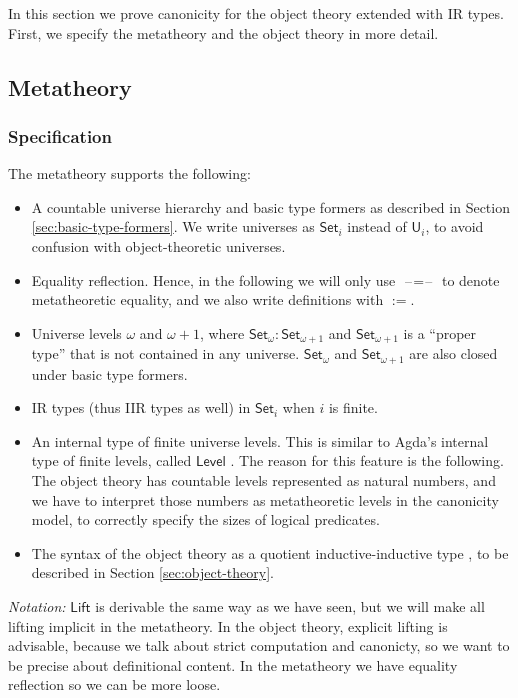 \documentclass[acmsmall,screen,review,anonymous]{acmart}
\newcommand{\msf}[1]{{\mathsf{#1}}}
\newcommand{\U}{\msf{U}}
\newcommand{\Set}{\msf{Set}}
\newcommand{\Lift}{\msf{Lift}}
\newcommand{\blank}{{\mathord{\hspace{1pt}\text{--}\hspace{1pt}}}}
\newcommand{\Level}{\msf{Level}}
\begin{document}
In this section we prove canonicity for the object theory extended with IR types. First, we specify
the metatheory and the object theory in more detail.

\subsection{Metatheory}\label{sec:metatheory}

\subsubsection{Specification} The metatheory supports the following:
\begin{itemize}
  \item A countable universe hierarchy and basic type formers as described in Section \ref{sec:basic-type-formers}.
    We write universes as $\Set_i$ instead of $\U_i$, to avoid confusion with object-theoretic
    universes.
  \item Equality reflection. Hence, in the following we will only use $\blank\!=\!\blank$ to denote
    metatheoretic equality, and we also write definitions with $:=$.
  \item Universe levels $\omega$ and $\omega+1$, where $\Set_\omega : \Set_{\omega + 1}$ and $\Set_{\omega + 1}$
        is a ``proper type'' that is not contained in any universe. $\Set_\omega$ and $\Set_{\omega + 1}$ are
        also closed under basic type formers.
  \item IR types (thus IIR types as well) in $\Set_i$ when $i$ is finite.
  \item An internal type of finite universe levels. This is similar to Agda's internal type of
    finite levels, called $\Level$ \cite{agdadocs}. The reason for this feature is the following. The
    object theory has countable levels represented as natural numbers, and we have to interpret
    those numbers as metatheoretic levels in the canonicity model, to correctly specify the sizes of
    logical predicates.
  \item The syntax of the object theory as a quotient inductive-inductive type \cite{ttintt,DBLP:journals/corr/abs-2302-08837}, to be
    described in Section \ref{sec:object-theory}.
\end{itemize}
\emph{Notation:} $\Lift$ is derivable the same way as we have seen, but we will make all
lifting implicit in the metatheory. In the object theory, explicit lifting is advisable, because
we talk about strict computation and canonicty, so we want to be precise about definitional
content. In the metatheory we have equality reflection so we can be more loose.
\end{document}
